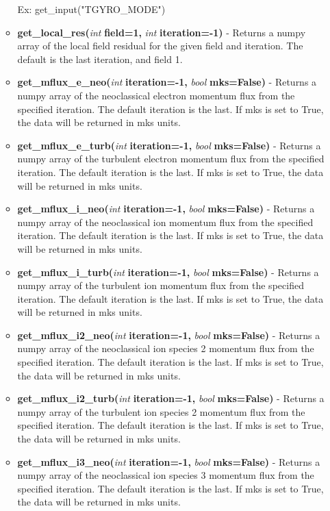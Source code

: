 \documentclass{article}
\begin{document}
\begin{itemize}
\begin{itemize}
Ex: get\_input("TGYRO\_MODE")
\item \textbf{get\_local\_res(}\emph{int}\textbf{ field=1,}\emph{ int}\textbf{ iteration=-1)} - Returns a numpy array of the local field residual for the given field and iteration.  The default is the last iteration, and field 1.
\item \textbf{get\_mflux\_e\_neo(}\emph{int}\textbf{ iteration=-1,}\emph{ bool}\textbf{ mks=False)} - Returns a numpy array of the neoclassical electron momentum flux from the specified iteration.  The default iteration is the last.  If mks is set to True, the data will be returned in mks units.
\item \textbf{get\_mflux\_e\_turb(}\emph{int}\textbf{ iteration=-1,}\emph{ bool}\textbf{ mks=False)} - Returns a numpy array of the turbulent electron momentum flux from the specified iteration.  The default iteration is the last.  If mks is set to True, the data will be returned in mks units.
\item \textbf{get\_mflux\_i\_neo(}\emph{int}\textbf{ iteration=-1,}\emph{ bool}\textbf{ mks=False)} - Returns a numpy array of the neoclassical ion momentum flux from the specified iteration.  The default iteration is the last.  If mks is set to True, the data will be returned in mks units.
\item \textbf{get\_mflux\_i\_turb(}\emph{int}\textbf{ iteration=-1,}\emph{ bool}\textbf{ mks=False)} - Returns a numpy array of the turbulent ion momentum flux from the specified iteration.  The default iteration is the last.  If mks is set to True, the data will be returned in mks units.
\item \textbf{get\_mflux\_i2\_neo(}\emph{int}\textbf{ iteration=-1,}\emph{ bool}\textbf{ mks=False)} - Returns a numpy array of the neoclassical ion species 2 momentum flux from the specified iteration.  The default iteration is the last.  If mks is set to True, the data will be returned in mks units.
\item \textbf{get\_mflux\_i2\_turb(}\emph{int}\textbf{ iteration=-1,}\emph{ bool}\textbf{ mks=False)} - Returns a numpy array of the turbulent ion species 2 momentum flux from the specified iteration.  The default iteration is the last.  If mks is set to True, the data will be returned in mks units.
\item \textbf{get\_mflux\_i3\_neo(}\emph{int}\textbf{ iteration=-1,}\emph{ bool}\textbf{ mks=False)} - Returns a numpy array of the neoclassical ion species 3 momentum flux from the specified iteration.  The default iteration is the last.  If mks is set to True, the data will be returned in mks units.

\end{itemize}
\end{itemize}
\end{document}
